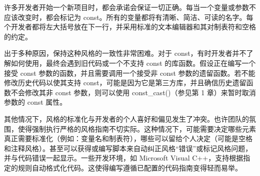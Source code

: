 许多开发者开始一个新项目时，都会承诺会保证一切正确。每当一个变量或参数不应该改变时，都会标记为 const。所有的变量都将有清晰、简洁、可读的名字。每个开发者都将左大括号放在下一行，并采用标准的文本编辑器和其对制表符和空格的约定。

出于多种原因，保持这种风格的一致性非常困难。对于 const，有时开发者并不了解如何使用，最终会遇到旧代码或一个不支持 const 的库函数。假设正在编写一个接受 const 参数的函数，并且需要调用一个接受非 const 参数的遗留函数。若不能修改历史代码以使其支持 const，可能是因为它是第三方库，并且确信历史遗留函数不会修改其非 const 参数，则可以使用 const\_cast()（参见第 1 章）来暂时取消参数的 const 属性。

其他情况下，风格的标准化与开发者的个人喜好和偏见发生了冲突。也许团队的氛围，使得强制执行严格的风格指南不切实际。这种情况下，可能需要决定哪些元素真正需要标准化（例如：变量名和制表符），哪些可以留给个人决定（可能是空格和注释风格）。甚至可以获得或编写脚本来自动纠正风格“错误”或标记风格问题，并与代码错误一起显示。一些开发环境，如 Microsoft Visual C++，支持根据指定的规则自动格式化代码。这使得编写遵循已配置的代码指南变得轻而易举。